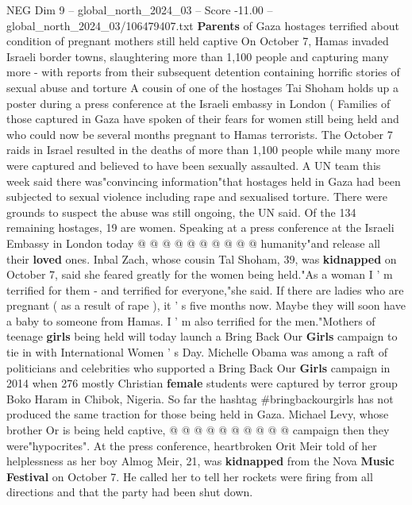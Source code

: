 \begin{textsample}{NEG Dim 9 – global\_north\_2024\_03 – Score -11.00 – global\_north\_2024\_03/106479407.txt}  \label{ex:f9_neg_241}
\textbf{Parents} of Gaza hostages terrified about condition of pregnant mothers still held captive On October 7, Hamas invaded Israeli border towns, slaughtering more than 1,100 people and capturing many more - with reports from their subsequent detention containing horrific stories of sexual abuse and torture A cousin of one of the hostages Tai Shoham holds up a poster during a press conference at the Israeli embassy in London ( Families of those captured in Gaza have spoken of their fears for women still being held and who could now be several months pregnant to Hamas terrorists.
The October 7 raids in Israel resulted in the deaths of more than 1,100 people while many more were captured and believed to have been sexually assaulted.
A UN team this week said there was"convincing information"that hostages held in Gaza had been subjected to sexual violence including rape and sexualised torture.
There were grounds to suspect the abuse was still ongoing, the UN said.
Of the 134 remaining hostages, 19 are women.
Speaking at a press conference at the Israeli Embassy in London today @ @ @ @ @ @ @ @ @ @ humanity"and release all their \textbf{loved} ones.
Inbal Zach, whose cousin Tal Shoham, 39, was \textbf{kidnapped} on October 7, said she feared greatly for the women being held."As a woman I ' m terrified for them - and terrified for everyone,"she said.
If there are ladies who are pregnant ( as a result of rape ), it ' s five months now.
Maybe they will soon have a baby to someone from Hamas.
I ' m also terrified for the men."Mothers of teenage \textbf{girls} being held will today launch a Bring Back Our \textbf{Girls} campaign to tie in with International Women ' s Day.
Michelle Obama was among a raft of politicians and celebrities who supported a Bring Back Our \textbf{Girls} campaign in 2014 when 276 mostly Christian \textbf{female} students were captured by terror group Boko Haram in Chibok, Nigeria.
So far the hashtag \#bringbackourgirls has not produced the same traction for those being held in Gaza.
Michael Levy, whose brother Or is being held captive, @ @ @ @ @ @ @ @ @ @ campaign then they were"hypocrites".
At the press conference, heartbroken Orit Meir told of her helplessness as her boy Almog Meir, 21, was \textbf{kidnapped} from the Nova \textbf{Music} \textbf{Festival} on October 7.
He called her to tell her rockets were firing from all directions and that the party had been shut down.

\end{textsample}
